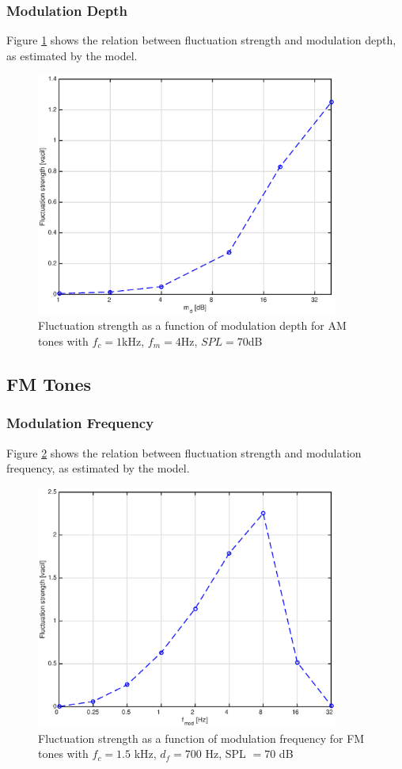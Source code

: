 \documentclass[a4paper]{article}
\begin{document}
\subsubsection{Modulation Depth}

Figure \ref{fig:AMtonesmdplot} shows the relation between fluctuation strength
and modulation depth, as estimated by the model.

\begin{figure}[ht]
    \centering
    \includegraphics[height=8cm]{img/am_tones_md_plot}
    \caption{Fluctuation strength as a function of modulation depth for AM tones
        with $f_c = 1 $kHz, $f_m = 4 $Hz, $SPL = 70 $dB}
    \label{fig:AMtonesmdplot}
\end{figure}

\subsection{FM Tones}

\subsubsection{Modulation Frequency}

Figure \ref{fig:FMtonesfmplot} shows the relation between fluctuation strength
and modulation frequency, as estimated by the model.

\begin{figure}[ht]
    \centering
    \includegraphics[height=8cm]{img/fm_tones_fm_plot}
    \caption{Fluctuation strength as a function of modulation frequency for FM
        tones with $f_c = 1.5$ kHz, $d_f = 700$ Hz, SPL $= 70$ dB}
    \label{fig:FMtonesfmplot}
\end{figure}
\end{document}
